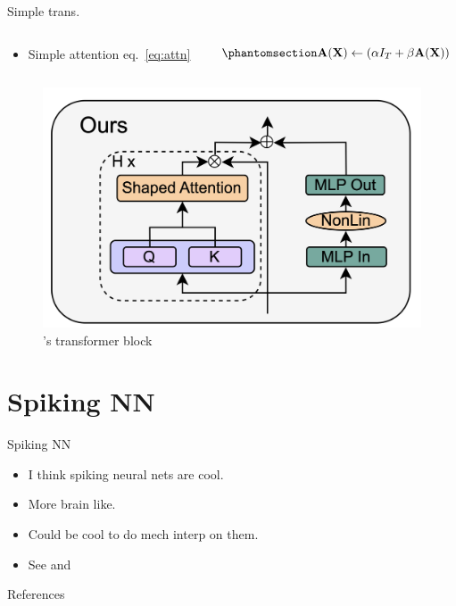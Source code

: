 \documentclass[aspectratio=32]{beamer}
\providecommand{\tightlist}{\setlength{\itemsep}{0pt}\setlength{\parskip}{0pt}}
\begin{document}
  \begin{frame}[allowframebreaks]{\textbar{} Simple trans. \autocite{he2023}}
  \begin{columns}[c]
  \begin{column}{0.48\textwidth}
  \begin{itemize}
  \tightlist
  \item
    Simple attention eq.~\ref{eq:attn}
  \end{itemize}
  \end{column}

  \begin{column}{0.48\textwidth}
  \begin{equation}\phantomsection\label{eq:attn}{\textbf{A}(\textbf{X}) \leftarrow (\alpha I_T + \beta \textbf{A}(\textbf{X}))}\end{equation}
  \end{column}
  \end{columns}

  \framebreak

  \begin{figure}
  \centering
  \includegraphics{attn.png}
  \caption{\textcite{he2023}'s transformer block}
  \end{figure}
  \end{frame}

  \section{\textbar{} Spiking NN}\label{spiking-nn}

  \begin{frame}[allowframebreaks]{\textbar{} Spiking NN}
  \begin{itemize}
  \tightlist
  \item
    I think spiking neural nets are cool.
  \item
    More brain like.
  \item
    Could be cool to do mech interp on them.
  \item
    See \textcite{olin-ammentorp2021} and \textcite{hu2014}
  \end{itemize}
  \end{frame}

  
\begin{frame}[allowframebreaks]
  \Large{References}
  \small\linespread{1.2}\printbibliography
\end{frame}
\end{document}
